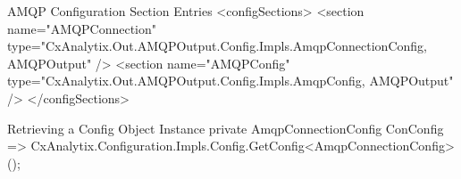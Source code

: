 \begin{code}{AMQP Configuration Section Entries}{\label{lst:config_sections}}{}
<configSections>
    <section name="AMQPConnection" 
        type="CxAnalytix.Out.AMQPOutput.Config.Impls.AmqpConnectionConfig, AMQPOutput"
        />
    <section name="AMQPConfig" 
        type="CxAnalytix.Out.AMQPOutput.Config.Impls.AmqpConfig, AMQPOutput"
        />
</configSections>
\end{code}


\begin{code}{Retrieving a Config Object Instance}{\label{lst:amqp_config}}{}
private AmqpConnectionConfig ConConfig =>
    CxAnalytix.Configuration.Impls.Config.GetConfig<AmqpConnectionConfig>();
\end{code}
    